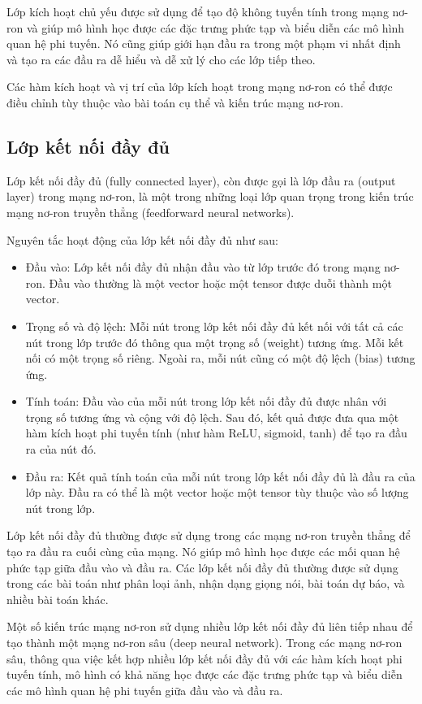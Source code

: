 Lớp kích hoạt chủ yếu được sử dụng để tạo độ không tuyến tính trong mạng nơ-ron và giúp mô hình học được các đặc trưng phức tạp và biểu diễn các mô hình quan hệ phi tuyến. Nó cũng giúp giới hạn đầu ra trong một phạm vi nhất định và tạo ra các đầu ra dễ hiểu và dễ xử lý cho các lớp tiếp theo.

Các hàm kích hoạt và vị trí của lớp kích hoạt trong mạng nơ-ron có thể được điều chỉnh tùy thuộc vào bài toán cụ thể và kiến trúc mạng nơ-ron.

\subsection{Lớp kết nối đầy đủ}
Lớp kết nối đầy đủ (fully connected layer), còn được gọi là lớp đầu ra (output layer) trong mạng nơ-ron, là một trong những loại lớp quan trọng trong kiến trúc mạng nơ-ron truyền thẳng (feedforward neural networks).

Nguyên tắc hoạt động của lớp kết nối đầy đủ như sau:

\begin{itemize}
    \item Đầu vào: Lớp kết nối đầy đủ nhận đầu vào từ lớp trước đó trong mạng nơ-ron. Đầu vào thường là một vector hoặc một tensor được duỗi thành một vector.
    \item Trọng số và độ lệch: Mỗi nút trong lớp kết nối đầy đủ kết nối với tất cả các nút trong lớp trước đó thông qua một trọng số (weight) tương ứng. Mỗi kết nối có một trọng số riêng. Ngoài ra, mỗi nút cũng có một độ lệch (bias) tương ứng.
    \item Tính toán: Đầu vào của mỗi nút trong lớp kết nối đầy đủ được nhân với trọng số tương ứng và cộng với độ lệch. Sau đó, kết quả được đưa qua một hàm kích hoạt phi tuyến tính (như hàm ReLU, sigmoid, tanh) để tạo ra đầu ra của nút đó.
    \item Đầu ra: Kết quả tính toán của mỗi nút trong lớp kết nối đầy đủ là đầu ra của lớp này. Đầu ra có thể là một vector hoặc một tensor tùy thuộc vào số lượng nút trong lớp.
\end{itemize}

Lớp kết nối đầy đủ thường được sử dụng trong các mạng nơ-ron truyền thẳng để tạo ra đầu ra cuối cùng của mạng. Nó giúp mô hình học được các mối quan hệ phức tạp giữa đầu vào và đầu ra. Các lớp kết nối đầy đủ thường được sử dụng trong các bài toán như phân loại ảnh, nhận dạng giọng nói, bài toán dự báo, và nhiều bài toán khác.

Một số kiến trúc mạng nơ-ron sử dụng nhiều lớp kết nối đầy đủ liên tiếp nhau để tạo thành một mạng nơ-ron sâu (deep neural network). Trong các mạng nơ-ron sâu, thông qua việc kết hợp nhiều lớp kết nối đầy đủ với các hàm kích hoạt phi tuyến tính, mô hình có khả năng học được các đặc trưng phức tạp và biểu diễn các mô hình quan hệ phi tuyến giữa đầu vào và đầu ra.

